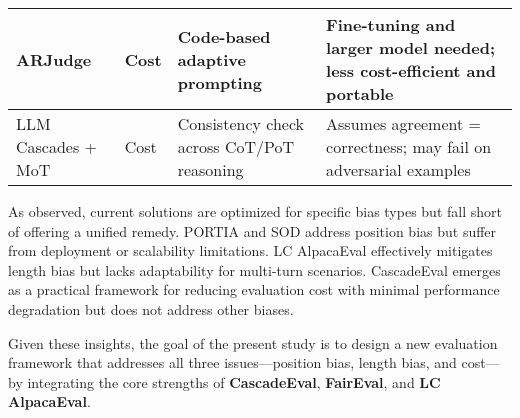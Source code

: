 \documentclass[sigconf, authoryear]{acmart}
\begin{document}
\begin{table}[H]
{\begin{tabular}{|p{2.6cm}|p{1.6cm}|p{3.0cm}|p{4.2cm}|}
            \hline
            ARJudge            & Cost                       & Code-based adaptive prompting                                               & Fine-tuning and larger model needed; less cost-efficient and portable                       \\
            \hline
            LLM Cascades + MoT & Cost                       & Consistency check across CoT/PoT reasoning                                  & Assumes agreement = correctness; may fail on adversarial examples                           \\
            \hline
        \end{tabular}%
    }
\end{table}

As observed, current solutions are optimized for specific bias types but fall short of offering a unified remedy.
PORTIA and SOD address position bias but suffer from deployment or scalability limitations.
LC AlpacaEval effectively mitigates length bias but lacks adaptability for multi-turn scenarios.
CascadeEval emerges as a practical framework for reducing evaluation cost with minimal performance degradation but does not address other biases.

Given these insights, the goal of the present study is to design a new evaluation framework that addresses all three issues—position bias, length bias, and cost—by integrating the core strengths of \textbf{CascadeEval}, \textbf{FairEval}, and \textbf{LC AlpacaEval}.




\end{document}
